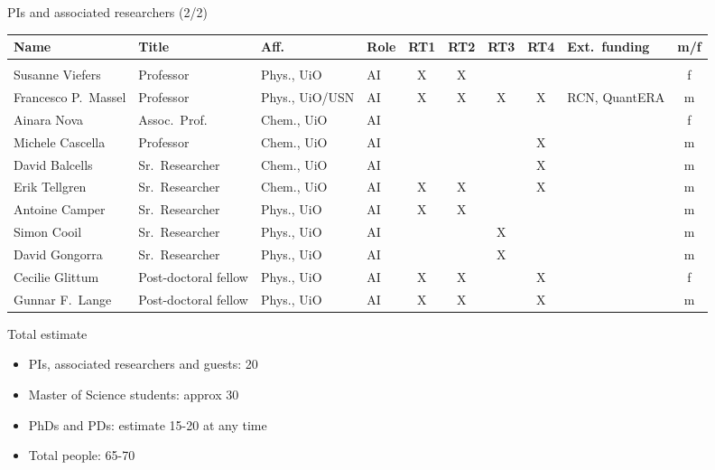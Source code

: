 \documentclass[10pt,aspectratio=169]{beamer}
\begin{document}
\begin{frame}{PIs and associated researchers (2/2)}
\begin{table}[h]
\centering
\scriptsize
\setlength{\tabcolsep}{3.5pt}
\renewcommand{\arraystretch}{1.3}
\begin{tabular}{@{}>{\raggedright\arraybackslash}p{2.7cm}>{\raggedright\arraybackslash}p{1.9cm}llcccc>{\raggedright\arraybackslash}p{2.3cm}c@{}}
\toprule
\textbf{Name} & \textbf{Title} & \textbf{Aff.} & \textbf{Role} & \textbf{RT1} & \textbf{RT2} & \textbf{RT3} & \textbf{RT4} & \textbf{Ext.\ funding} & \textbf{m/f}\\
\midrule
\multicolumn{10}{@{}l}{\textit{Associated investigators (AI)}}\\
Susanne Viefers       & Professor            & Phys., UiO     & AI & X & X &   &   &                & f\\
Francesco P.\ Massel  & Professor            & Phys., UiO/USN & AI & X & X & X & X & RCN, QuantERA  & m\\
Ainara Nova           & Assoc.\ Prof.\       & Chem., UiO     & AI &   &   &   &   &                & f\\
Michele Cascella      & Professor            & Chem., UiO     & AI &   &   &   & X &                & m\\
David Balcells        & Sr.\ Researcher      & Chem., UiO     & AI &   &   &   & X &                & m\\
Erik Tellgren         & Sr.\ Researcher      & Chem., UiO     & AI & X & X &   & X &                & m\\
Antoine Camper        & Sr.\ Researcher      & Phys., UiO     & AI & X & X &   &   &                & m\\
Simon Cooil           & Sr.\ Researcher      & Phys., UiO     & AI &   &   & X &   &                & m\\
David Gongorra        & Sr.\ Researcher      & Phys., UiO     & AI &   &   & X &   &                & m\\
Cecilie Glittum       & Post-doctoral fellow & Phys., UiO     & AI & X & X &   & X &                & f\\
Gunnar F.\ Lange      & Post-doctoral fellow & Phys., UiO     & AI & X & X &   & X &                & m\\
\bottomrule
\end{tabular}
\end{table}
\end{frame}


\begin{frame}{Total estimate}
  \begin{itemize}
  \item PIs, associated researchers and guests: 20
  \item Master of Science students: approx 30
  \item PhDs and PDs: estimate 15-20 at any time
  \item Total people: 65-70
  \end{itemize}
\end{frame}
\end{document}
